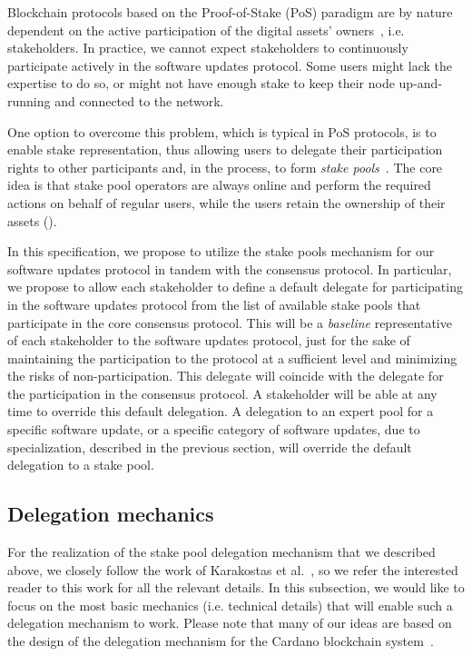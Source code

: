 \documentclass[11pt,a4paper]{article}
\begin{document}
Blockchain protocols based on the Proof-of-Stake (PoS) paradigm are by nature
dependent on the active participation of the digital assets'
owners~\cite{stakepools}, i.e. stakeholders.
%
In practice, we cannot expect stakeholders to continuously participate actively
in the software updates protocol.
%
Some users might lack the expertise to do so, or might not have enough stake to
keep their node up-and-running and connected to the network.

One option to overcome this problem, which is typical in PoS protocols, is to
enable stake representation, thus allowing users to delegate their participation
rights to other participants and, in the process, to form \emph{stake
  pools}~\cite{stakepools}. The core idea is that stake pool operators are
always online and perform the required actions on behalf of regular users, while
the users retain the ownership of their assets (\cite{stakepools}).

In this specification, we propose to utilize the stake pools mechanism for our
software updates protocol in tandem with the consensus protocol. In particular,
we propose to allow each stakeholder to define a default delegate for
participating in the software updates protocol from the list of available stake
pools that participate in the core consensus protocol.
%
This will be a \emph{baseline} representative of each stakeholder to the
software updates protocol, just for the sake of maintaining the participation to
the protocol at a sufficient level and minimizing the risks of
non-participation. This delegate will coincide with the delegate for the
participation in the consensus protocol. A stakeholder will be able at any time
to override this default delegation. A delegation to an expert pool for a
specific software update, or a specific category of software updates, due to
specialization, described in the previous section, will override the default
delegation to a stake pool.

\subsection{Delegation mechanics}
\label{sec:delegation-mechanics}

For the realization of the stake pool delegation mechanism that we described
above, we closely follow the work of Karakostas et al.~\cite{stakepools}, so we
refer the interested reader to this work for all the relevant details.
%
In this subsection, we would like to focus on the most basic mechanics (i.e.
technical details) that will enable such a delegation mechanism to work. Please
note that many of our ideas are based on the design of the delegation mechanism
for the Cardano blockchain system~\cite{deldesign}.
\end{document}

